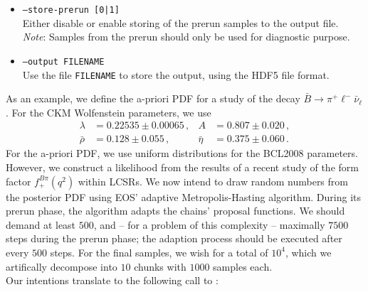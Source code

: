 \begin{itemize}
    \item[] \texttt{--store-prerun [0|1]}\\[\medskipamount]
        Either disable or enable storing of the prerun samples to the output file.\\

        \emph{Note}: Samples from the prerun should only be used for diagnostic purpose.

    \item[] \texttt{--output FILENAME}\\[\medskipamount]
        Use the file \texttt{FILENAME} to store the output, using the HDF5 file format.
\end{itemize}

As an example, we define the a-priori \gls{PDF} for a study of the decay $\bar{B}\to \pi^+\ell^-\bar\nu_\ell$.
For the CKM Wolfenstein parameters, we use
\begin{equation*}
\begin{aligned}
    \lambda    & = 0.22535 \pm 0.00065\,,  &
    A          & = 0.807 \pm 0.020\,,      \\
    \bar{\rho} & = 0.128 \pm 0.055\,,      &
    \bar{\eta} & = 0.375 \pm 0.060\,.
\end{aligned}
\end{equation*}
For the a-priori \gls{PDF}, we use uniform distributions for the BCL2008 \cite{Bourrely:2008za}
parameters. However, we construct a likelihood from the results of a recent study of the form factor
$f^{B\pi}_+(q^2)$ within \glspl{LCSR}. 
We now intend to draw random numbers from the posterior PDF using EOS' adaptive Metropolis-Hasting algorithm.
During its prerun phase, the algorithm adapts the chains' proposal
functions. We should demand at least $500$, and -- for a problem of this complexity -- maximally
$7500$ steps during the prerun phase; the adaption process should be executed
after every $500$ steps. For the final samples, we wish for a total of $10^4$, which we artifically decompose
into $10$ chunks with $1000$ samples each.\\

Our intentions translate to the following call to :


%
